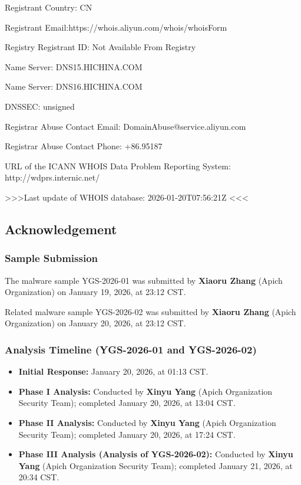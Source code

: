 \documentclass[
]{article}
\newenvironment{Shaded}{}{}
\newcommand{\NormalTok}[1]{#1}
\begin{document}
\begin{Shaded}
\begin{Highlighting}[]
\NormalTok{Registrant Country: CN}

\NormalTok{Registrant Email:https://whois.aliyun.com/whois/whoisForm}

\NormalTok{Registry Registrant ID: Not Available From Registry}

\NormalTok{Name Server: DNS15.HICHINA.COM}

\NormalTok{Name Server: DNS16.HICHINA.COM}

\NormalTok{DNSSEC: unsigned}

\NormalTok{Registrar Abuse Contact Email: DomainAbuse@service.aliyun.com}

\NormalTok{Registrar Abuse Contact Phone: +86.95187}

\NormalTok{URL of the ICANN WHOIS Data Problem Reporting System: http://wdprs.internic.net/}

\NormalTok{\textgreater{}\textgreater{}\textgreater{}Last update of WHOIS database: 2026{-}01{-}20T07:56:21Z \textless{}\textless{}\textless{}}
\end{Highlighting}
\end{Shaded}

\subsection{Acknowledgement}\label{acknowledgement-2}

\subsubsection{\texorpdfstring{\textbf{Sample
Submission}}{Sample Submission}}\label{sample-submission-2}

The malware sample YGS-2026-01 was submitted by \textbf{Xiaoru Zhang}
(Apich Organization) on January 19, 2026, at 23:12 CST.

Related malware sample YGS-2026-02 was submitted by \textbf{Xiaoru
Zhang} (Apich Organization) on January 20, 2026, at 23:12 CST.

\subsubsection{\texorpdfstring{\textbf{Analysis Timeline (YGS-2026-01
and
YGS-2026-02)}}{Analysis Timeline (YGS-2026-01 and YGS-2026-02)}}\label{analysis-timeline-ygs-2026-01-and-ygs-2026-02}

\begin{itemize}
\item
  \textbf{Initial Response:} January 20, 2026, at 01:13 CST.
\item
  \textbf{Phase I Analysis:} Conducted by \textbf{Xinyu Yang} (Apich
  Organization Security Team); completed January 20, 2026, at 13:04 CST.
\item
  \textbf{Phase II Analysis:} Conducted by \textbf{Xinyu Yang} (Apich
  Organization Security Team); completed January 20, 2026, at 17:24 CST.
\item
  \textbf{Phase III Analysis (Analysis of YGS-2026-02):} Conducted by
  \textbf{Xinyu Yang} (Apich Organization Security Team); completed
  January 21, 2026, at 20:34 CST.
\end{itemize}
\end{document}
